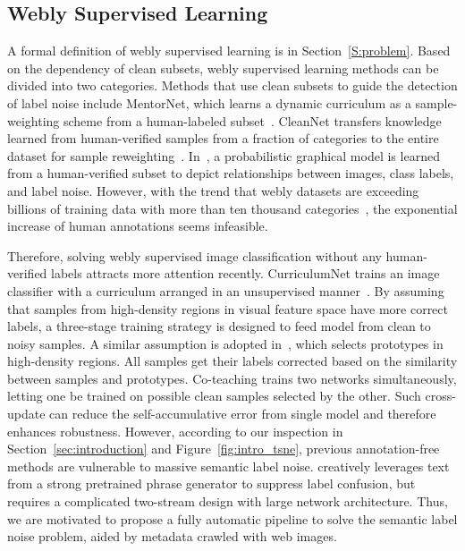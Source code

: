 \documentclass[sigconf]{acmart}
\begin{document}
\subsection{Webly Supervised Learning}
\label{sec:related-webly}
A formal definition of webly supervised learning is in Section~\ref{S:problem}.
Based on the dependency of clean subsets, webly supervised learning methods can be divided into two categories.
Methods that use clean subsets to guide the detection of label noise include MentorNet, which learns a dynamic curriculum as a sample-weighting scheme from a human-labeled subset~\cite{jiang2017mentornet}. CleanNet transfers knowledge learned from human-verified samples from a fraction of categories to the entire dataset for sample reweighting~\cite{lee2018cleannet}. In~\cite{xiao2015learning}, a probabilistic graphical model is learned from a human-verified subset to depict relationships between images, class labels, and label noise. However, with the trend that webly datasets are exceeding billions of training data with more than ten thousand categories~\cite{wu2019tencent}, the exponential increase of human annotations seems infeasible.

Therefore, solving webly supervised image classification without any human-verified labels attracts more attention recently. CurriculumNet trains an image classifier with a curriculum arranged in an unsupervised manner~\cite{guo2018curriculumnet}. By assuming that samples from high-density regions in visual feature space have more correct labels, a three-stage training strategy is designed to feed model from clean to noisy samples. 
A similar assumption is adopted in~\cite{han2019deep}, which selects prototypes in high-density regions. All samples get their labels corrected based on the similarity between samples and prototypes. 
Co-teaching trains two networks simultaneously, letting one be trained on possible clean samples selected by the other. Such cross-update can reduce the self-accumulative error from single model and therefore enhances robustness.
However, according to our inspection in Section~\ref{sec:introduction} and Figure~\ref{fig:intro_tsne}, previous annotation-free methods are vulnerable to massive semantic label noise. 
\cite{shah2019inferring} creatively leverages text from a strong pretrained phrase generator to suppress label confusion, but requires a complicated two-stream design with large network architecture.
Thus, we are motivated to propose a fully automatic pipeline to solve the semantic label noise problem, aided by metadata crawled with web images.
\end{document}
